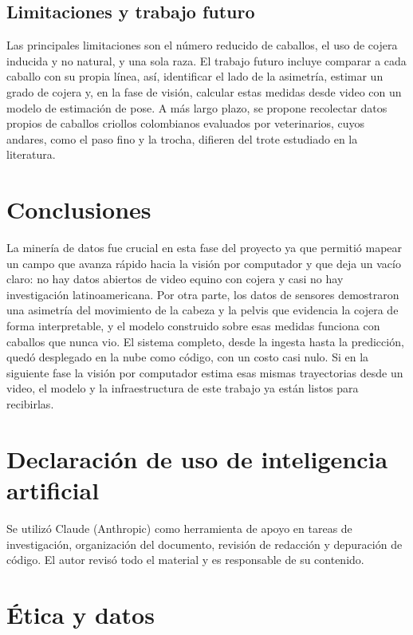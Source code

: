 \documentclass[conference,a4paper]{IEEEtran}
\begin{document}
\subsection{Limitaciones y trabajo futuro}

Las principales limitaciones son el número reducido de caballos, el uso de cojera inducida y no natural, y una sola raza. El trabajo futuro incluye comparar a cada caballo con su propia línea, así, identificar el lado de la asimetría, estimar un grado de cojera y, en la fase de visión, calcular estas medidas desde video con un modelo de estimación de pose. A más largo plazo, se propone recolectar datos propios de caballos criollos colombianos evaluados por veterinarios, cuyos andares, como el paso fino y la trocha, difieren del trote estudiado en la literatura.

\section{Conclusiones}

La minería de datos fue crucial en esta fase del proyecto ya que permitió mapear un campo que avanza rápido hacia la visión por computador y que deja un vacío claro: no hay datos abiertos de video equino con cojera y casi no hay investigación latinoamericana. Por otra parte, los datos de sensores demostraron una asimetría del movimiento de la cabeza y la pelvis que evidencia la cojera de forma interpretable, y el modelo construido sobre esas medidas funciona con caballos que nunca vio. El sistema completo, desde la ingesta hasta la predicción, quedó desplegado en la nube como código, con un costo casi nulo. Si en la siguiente fase la visión por computador estima esas mismas trayectorias desde un video, el modelo y la infraestructura de este trabajo ya están listos para recibirlas.

\section*{Declaración de uso de inteligencia artificial}

Se utilizó Claude (Anthropic) como herramienta de apoyo en tareas de investigación, organización del documento, revisión de redacción y depuración de código. El autor revisó todo el material y es responsable de su contenido.

\section*{Ética y datos}
\end{document}
